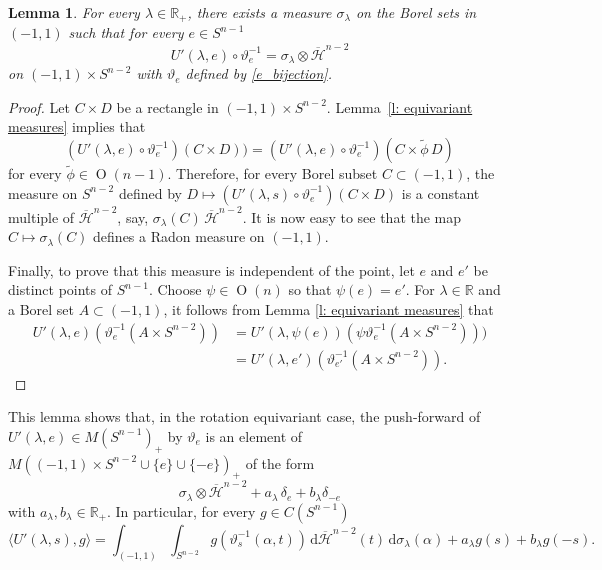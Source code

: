 \documentclass[11pt, a4paper]{amsart}
\newtheorem{lemma}[proposition]{Lemma}
\renewcommand{\d}{\,\mathrm{d}}
\newcommand{\rp}{\mathbb R_{\scriptscriptstyle +}}
\newcommand{\sn}{{S^{n-1}}}
\newcommand{\sm}{S^{n-2}}
\newcommand{\on}{\operatorname{O}(n)}
\newcommand{\om}{\operatorname{O}(n-1)}
\renewcommand{\d}{\,\mathrm{d}}
\newcommand{\pole}{e}
\newcommand{\measn}{M(\sn )_{\scriptscriptstyle +}}
\newcommand{\R}{\mathbb R}
\begin{document}
\begin{lemma}\label{l:haar n-2}
For every $\lambda \in \rp$, there exists a measure $\sigma_\lambda$ on the Borel sets in $(-1,1)$ such that for every $\pole\in \sn$ 
$$U'(\lambda, \pole)\circ \vartheta^{-1}_{\pole} = \sigma_\lambda\otimes \overline{\mathcal{H}}^{n-2}$$
on $(-1,1)\times S^{n-2}$ with $\vartheta_{\pole}$ defined by \eqref{e_bijection}. 
\end{lemma} 
\begin{proof}
Let $C \times D$ be a rectangle in $ (-1,1)\times S^{n-2}$. Lemma~\ref{l: equivariant measures} implies that 
$$
(U'(\lambda, \pole)\circ\vartheta_{\pole}^{-1})(C\times D)) = (U'(\lambda, \pole)\circ\vartheta_{\pole}^{-1})(C\times \tilde{\phi} \, D)
$$
for every  $\tilde{\phi}\in \om$.
Therefore, for every Borel subset $C\subset (-1,1)$, the measure on $S^{n-2}$ defined by $D\mapsto (U'(\lambda, s)\circ\vartheta_{\pole}^{-1})(C\times D)$ is a constant multiple of $\overline{\mathcal{H}}^{n-2}$, say, $\sigma_\lambda(C) \,\overline{\mathcal{H}}^{n-2}$. It is now easy to see that the map $C\mapsto \sigma_\lambda(C)$ defines a Radon measure on $(-1,1)$. 

Finally, to prove that this measure is independent of the point, let $\pole$ and  $\pole'$ be distinct points of $S^{n-1}$. Choose $\psi\in \on$ so that $\psi(\pole)=\pole'$. For $\lambda\in\R$ and a Borel set $A\subset (-1,1)$, it follows from Lemma \ref{l: equivariant measures} that 
\begin{align}
U'(\lambda, \pole)(\vartheta^{-1}_\pole (A\times S^{n-2})) &= U'(\lambda, \psi(\pole))(\psi\vartheta^{-1}_\pole (A\times S^{n-2}))) \\
&= U'(\lambda, \pole')(\vartheta^{-1}_{\pole'}( A\times S^{n-2})). 
\end{align}
\end{proof}
\goodbreak
This lemma shows that, in the rotation equivariant case, the push-forward of $U'(\lambda, \pole)\in \measn$ by $\vartheta_\pole$ is an element of $M((-1,1)\times S^{n-2} \cup \{\pole\} \cup \{-\pole\})_{\scriptscriptstyle +}$ of the form 
\begin{equation}\label{eq:sigma}
\sigma_\lambda \otimes \overline{\mathcal{H}}^{n-2}    + a_\lambda \,\delta_{\pole} + b_\lambda \delta_{-\pole} 
\end{equation}
with $a_\lambda, b_\lambda \in \rp$. In particular, for every $g\in C(\sn)$
\begin{equation}
    \langle U'(\lambda,s),g\rangle =\int_{(-1,1)}\int_{\sm}g(\vartheta_s^{-1}(\alpha,t))\d \overline{\mathcal{H}}^{n-2}(t) \d \sigma_\lambda (\alpha) + a_\lambda g(s)+b_\lambda g(-s).
\end{equation}
\end{document}
